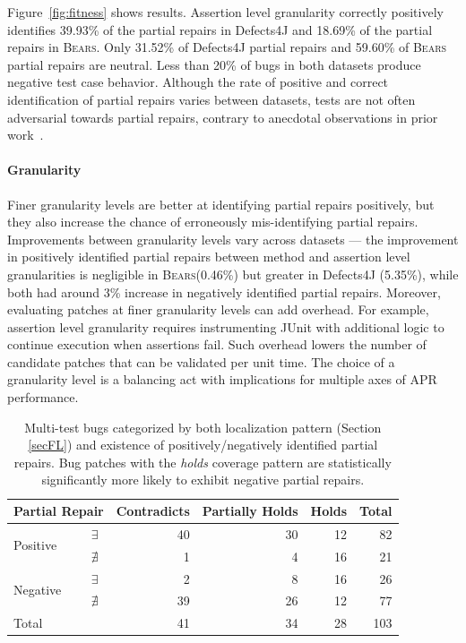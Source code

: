 \documentclass[10pt, conference]{IEEEtran}
\newcommand\bears{\textsc{Bears}\xspace}
\begin{document}
Figure~\ref{fig:fitness} shows results.
Assertion level granularity correctly positively identifies
39.93\% of the partial repairs in Defects4J
and 18.69\% of the partial repairs in \bears.
Only 31.52\% of Defects4J partial repairs and 
59.60\% 
of \bears partial repairs are neutral. Less than 20\% of bugs in both datasets
produce negative test case behavior.
Although the rate of positive and correct identification of partial repairs varies between datasets,
tests are not often adversarial towards partial repairs, contrary to anecdotal
observations in prior work~\cite{gecco09}.

\paragraph{Granularity} Finer granularity levels are better at identifying partial repairs positively,
but they also increase the chance of erroneously mis-identifying partial repairs.
Improvements between granularity levels vary across datasets --- the improvement 
in positively identified partial repairs between method and assertion level granularities
is negligible in \bears (0.46\%) but greater in Defects4J (5.35\%), while both had around 3\% 
increase in negatively identified partial repairs.
Moreover, evaluating patches at finer granularity levels can add overhead.
For example, assertion level granularity requires instrumenting JUnit with additional
logic to continue execution when assertions fail.
Such overhead lowers the number of
candidate patches that can be validated per unit time.
The choice of a granularity level is a balancing act with implications for
multiple axes of APR performance.


\begin{table}
  {\begin{center}
      \begin{tabular} {llrrrr}
        \toprule
        \multicolumn{2}{c}{Partial Repair} & Contradicts & Partially Holds & Holds & Total \\
        \midrule
        \multirow{2}{*}{Positive} & $\exists$  & 40 & 30 & 12 &  82 \\
                                  & $\nexists$ &  1 &  4 & 16 &  21 \\
        \midrule
        \multirow{2}{*}{Negative} & $\exists$  &  2 &  8 & 16 &  26 \\
                                  & $\nexists$ & 39 & 26 & 12 &  77 \\
        \midrule
        Total                     &            & 41 & 34 & 28 & 103 \\
        \bottomrule
      \end{tabular}
    \end{center}
  }
  \caption{\small Multi-test bugs categorized by both localization pattern
    (Section \ref{secFL}) and existence of positively/negatively identified
    partial repairs. Bug patches with the \emph{holds} coverage pattern are
    statistically significantly more likely to exhibit negative partial
    repairs.  \label{tab:cov_fitness}}
\end{table}
\end{document}
